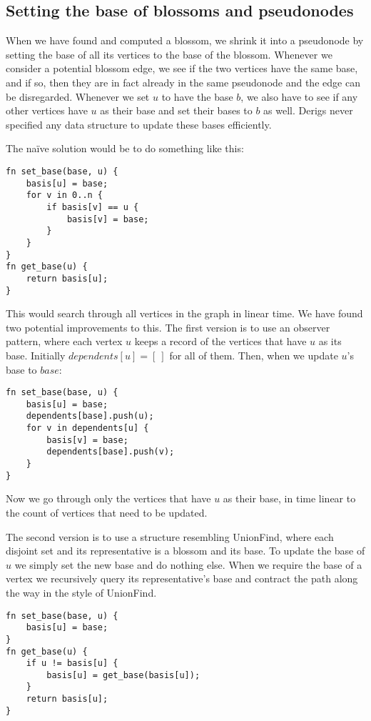\subsection{Setting the base of blossoms and pseudonodes}
\label{subsection:basis-code}
When we have found and computed a blossom, we shrink it into a pseudonode by setting the base of all its vertices to the base of the blossom. Whenever we consider a potential blossom edge, we see if the two vertices have the same base, and if so, then they are in fact already in the same pseudonode and the edge can be disregarded. Whenever we set $u$ to have the base $b$, we also have to see if any other vertices have $u$ as their base and set their bases to $b$ as well. Derigs never specified any data structure to update these bases efficiently.

The naïve solution would be to do something like this:
\begin{lstlisting}[caption={Näive basis},label=Listing,mathescape=true]
fn set_base(base, u) {
    basis[u] = base;
    for v in 0..n {
        if basis[v] == u {
            basis[v] = base;
        }
    }
}
fn get_base(u) {
    return basis[u];
}
\end{lstlisting}
This would search through all vertices in the graph in linear time. We have found two potential improvements to this. The first version is to use an observer pattern, where each vertex $u$ keeps a record of the vertices that have $u$ as its base. Initially $dependents[u] = [~]$ for all of them. Then, when we update $u$'s base to $base$:

\begin{lstlisting}[caption={Observer basis},label=Listing,mathescape=true]
fn set_base(base, u) {
    basis[u] = base;
    dependents[base].push(u);
    for v in dependents[u] {
        basis[v] = base;
        dependents[base].push(v);
    }
}
\end{lstlisting}

Now we go through only the vertices that have $u$ as their base, in time linear to the count of vertices that need to be updated.

The second version is to use a structure resembling UnionFind, where each disjoint set and its representative is a blossom and its base. To update the base of $u$ we simply set the new base and do nothing else. When we require the base of a vertex we recursively query its representative's base and contract the path along the way in the style of UnionFind. 

\begin{lstlisting}[caption={UF-like basis},label=Listing,mathescape=true]
fn set_base(base, u) {
    basis[u] = base;
}
fn get_base(u) {
    if u != basis[u] {
        basis[u] = get_base(basis[u]);
    }
    return basis[u];
}
\end{lstlisting}

